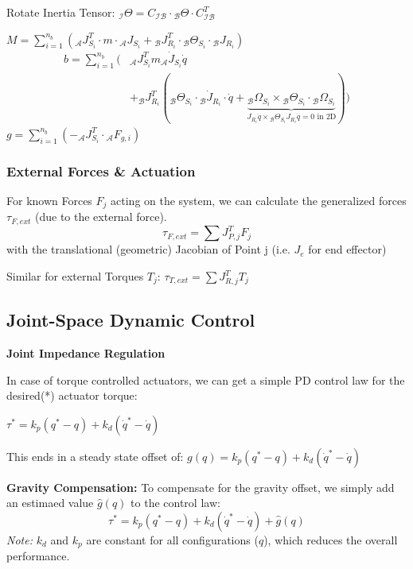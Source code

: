\documentclass[fontsize=6pt,DIV=calc,a4paper,ngerman]{scrartcl}
\begin{document}
\begin{multicols*}{4}
	Rotate Inertia Tensor: ${}_\mathcal{I}\Theta = C_\mathcal{IB}\cdot {}_\mathcal{B}\Theta \cdot C_\mathcal{IB}^T$

	$\displaystyle M  = \sum_{i=1}^{n_b}({}_\mathcal{A}J_{S_i}^T\cdot m\cdot  {}_\mathcal{A}J_{S_i}+{}_\mathcal{B}J_{R_i}^T\cdot{}_\mathcal{B}\Theta_{S_i}\cdot {}_\mathcal{B}J_{R_i})$\\
	\begin{equation*}\begin{split}
			b  = \sum_{i=1}^{n_b}( & {}_\mathcal{A}J_{S_i}^T m {}_\mathcal{A}\dot{J}_{S_i}\dot{q}
			\\ & + {}_\mathcal{B}J_{R_i}^T({}_\mathcal{B}\Theta_{S_i}\cdot {}_\mathcal{B}\dot{J}_{R_i}\cdot \dot{q} +
			\underbrace{{}_\mathcal{B}\Omega_{S_i}\times {}_\mathcal{B}\Theta_{S_i}\cdot {}_\mathcal{B}\Omega_{S_i}}_{J_{R_i}\dot{q} \times {}_\mathcal{B}\Theta_{S_i} J_{R_i}\dot{q} = 0 \text{ in 2D} } ))
		\end{split}\end{equation*}
	$\displaystyle g = \sum_{i=1}^{n_b}(-{}_\mathcal{A}J_{S_i}^T\cdot {}_\mathcal{A}F_{g,i})$


	\subsubsection{External Forces \& Actuation}
	For known Forces $F_j$ acting on the system, we can calculate the generalized forces $\tau_{F,ext}$ (due to the external force).
	$$\tau_{F,ext} = \sum J_{P,j}^T F_j$$
	with the translational (geometric) Jacobian of Point j (i.e. $J_e$ for end effector)

	Similar for external Torques $T_j$:
	$\displaystyle \tau_{T,ext} = \sum J_{R,j}^TT_{j}$

	\subsection{Joint-Space Dynamic Control}
	\textbf{Joint Impedance Regulation}

	In case of torque controlled actuators, we can get a simple PD control law for the desired(*) actuator torque:

	\centerline{$\tau^* = k_p(q^*-q)+k_d(\dot{q}^*-\dot{q})$}
	This ends in a steady state offset of:  $g(q) = k_p(q^*-q)+k_d(\dot{q}^*-\dot{q})$

	\textbf{Gravity Compensation:}
	To compensate for the gravity offset, we simply add an estimaed value $\hat{g}(q)$ to the control law:
	$$\tau^* = k_p(q^*-q)+k_d(\dot{q}^*-\dot{q})+\hat{g}(q)$$
	\textit{Note:} $k_d$ and $k_p$ are constant for all configurations ($q$), which reduces the overall performance.


\end{multicols*}
\end{document}

